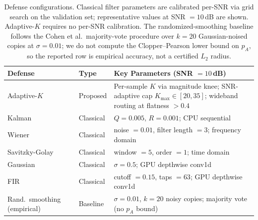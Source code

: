 \begin{table}[!ht]
\caption{Defense configurations. Classical filter parameters are calibrated
  per-SNR via grid search on the validation set; representative values at
  SNR $= 10$\,dB are shown. Adaptive-$K$ requires no per-SNR
  calibration. The randomized-smoothing baseline follows the Cohen et al.\
  majority-vote procedure over $k = 20$ Gaussian-noised copies at
  $\sigma = 0.01$; we do not compute the Clopper--Pearson lower bound on
  $p_A$, so the reported row is empirical accuracy, not a certified
  $L_2$ radius.}
\label{tab:defenses}
\centering
\small
\begin{tabular}{llp{4.5cm}}
\toprule
Defense & Type & Key Parameters (SNR $= 10$\,dB) \\
\midrule
Adaptive-$K$ & Proposed  & Per-sample $K$ via magnitude knee; SNR-adaptive cap $K_{\max}\in[20,35]$; wideband routing at flatness $>0.4$ \\
Kalman          & Classical & $Q = 0.005$, $R = 0.001$; CPU sequential \\
Wiener          & Classical & noise $= 0.01$, filter length $= 3$; frequency domain \\
Savitzky-Golay  & Classical & window $= 5$, order $= 1$; time domain \\
Gaussian        & Classical & $\sigma = 0.5$; GPU depthwise conv1d \\
FIR             & Classical & cutoff $= 0.15$, taps $= 63$; GPU depthwise conv1d \\
Rand.\ smoothing (empirical) & Baseline & $\sigma = 0.01$, $k = 20$ noisy copies; majority vote (no $p_A$ bound) \\
\bottomrule
\end{tabular}
\end{table}

